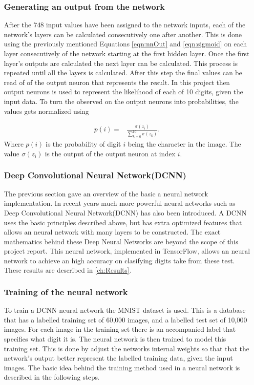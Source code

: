 \subsubsection{Generating an output from the network}
After the 748 input values have been assigned to the network inputs, each of the network's layers can be calculated consecutively one after another. This is done using the previously mentioned Equations \ref{eqn:nnOut} and \ref{eqn:sigmoid} on each layer consecutively of the network starting at the first hidden layer. Once the first layer's outputs are calculated the next layer can be calculated. This process is repeated until all the layers is calculated. After this step the final values can be read of of the output neuron that represents the result. In this project then output neurons is used to represent the likelihood of each of 10 digits, given the input data. To turn the observed on the output neurons into probabilities, the values gets normalized using


\begin{align}
  p(i) =  &\displaystyle{\frac{\sigma(z_{i})}{\sum_{k=0}^{10} \sigma(z_{k})}}.
\label{eqn:normal}
\end{align}
Where $p(i)$ is the probability of digit $i$ being the character in the image. The value $\sigma(z_{i})$ is the output of the output neuron at index $i$.

\subsubsection{Deep Convolutional Neural Network(DCNN)}

The previous section gave an overview of the basic a neural network implementation. In recent years much more powerful neural networks such as Deep Convolutional Neural Network(DCNN) has also been introduced. A DCNN uses the basic principles described above, but has extra optimized features that allows an neural network with many layers to be constructed. The exact mathematics behind these Deep Neural Networks are beyond the scope of this project report. This neural network, implemented in TensorFlow, allows an neural network to achieve an high accuracy on  clasifying digits take from these test. These results are described in \ref{ch:Results}.

\subsubsection{Training of the neural network}
\label{sec:trainNN}
To train a DCNN neural network the MNIST dataset is used. This is a database that has a labelled training set of 60,000 images, and a labelled test set of 10,000 images. For each image in the training set there is an accompanied label that specifies what digit it is. The neural network is then trained to model this training set. This is done by adjust the networks internal weights so that that the network's output better represent the labelled training data, given the input images. The basic idea behind the training method used in a neural network is described in the following steps.

